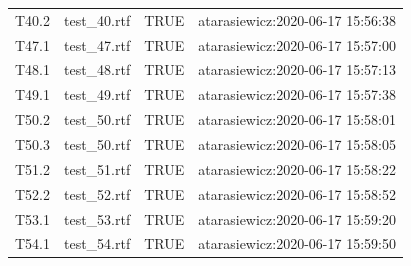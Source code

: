 \documentclass[]{article}
\begin{document}
\begin{longtable}{llll}
\rowcolor{gray!6}  T40.2 & test\_40.rtf & TRUE & atarasiewicz:2020-06-17 15:56:38\\
T47.1 & test\_47.rtf & TRUE & atarasiewicz:2020-06-17 15:57:00\\
\rowcolor{gray!6}  T48.1 & test\_48.rtf & TRUE & atarasiewicz:2020-06-17 15:57:13\\
\addlinespace
T49.1 & test\_49.rtf & TRUE & atarasiewicz:2020-06-17 15:57:38\\
\rowcolor{gray!6}  T50.2 & test\_50.rtf & TRUE & atarasiewicz:2020-06-17 15:58:01\\
T50.3 & test\_50.rtf & TRUE & atarasiewicz:2020-06-17 15:58:05\\
\rowcolor{gray!6}  T51.2 & test\_51.rtf & TRUE & atarasiewicz:2020-06-17 15:58:22\\
T52.2 & test\_52.rtf & TRUE & atarasiewicz:2020-06-17 15:58:52\\
\addlinespace
\rowcolor{gray!6}  T53.1 & test\_53.rtf & TRUE & atarasiewicz:2020-06-17 15:59:20\\
T54.1 & test\_54.rtf & TRUE & atarasiewicz:2020-06-17 15:59:50\\*
\end{longtable}
\end{document}
